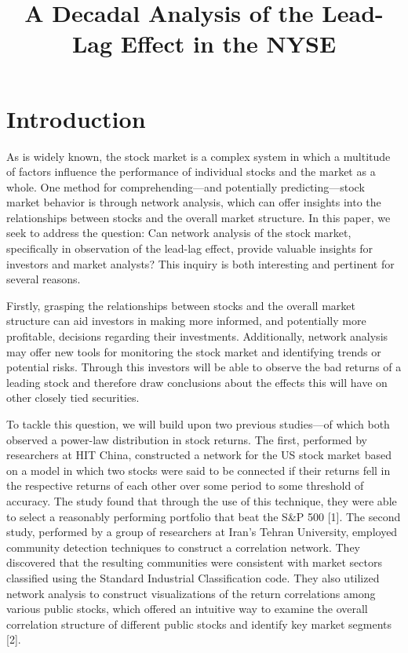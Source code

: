 \documentclass{article}
\title{A Decadal Analysis of the Lead-Lag Effect in the NYSE}
\begin{document}
\maketitle
\section{Introduction}
\large
As is widely known, the stock market is a complex system in which a multitude of factors influence the performance of individual stocks and the market as a whole. One method for comprehending—and potentially predicting—stock market behavior is through network analysis, which can offer insights into the relationships between stocks and the overall market structure. In this paper, we seek to address the question: Can network analysis of the stock market, specifically in observation of the lead-lag effect, provide valuable insights for investors and market analysts? This inquiry is both interesting and pertinent for several reasons.

Firstly, grasping the relationships between stocks and the overall market structure can aid investors in making more informed, and potentially more profitable, decisions regarding their investments. Additionally, network analysis may offer new tools for monitoring the stock market and identifying trends or potential risks. Through this investors will be able to observe the bad returns of a leading stock and therefore draw conclusions about the effects this will have on other closely tied securities.

To tackle this question, we will build upon two previous studies—of which both observed a power-law distribution in stock returns. The first, performed by researchers at HIT China, constructed a network for the US stock market based on a model in which two stocks were said to be connected if their returns fell in the respective returns of each other over some period to some threshold of accuracy. The study found that through the use of this technique, they were able to select a reasonably performing portfolio that beat the S\&P 500 [1]. The second study, performed by a group of researchers at Iran's Tehran University, employed community detection techniques to construct a correlation network. They discovered that the resulting communities were consistent with market sectors classified using the Standard Industrial Classification code. They also utilized network analysis to construct visualizations of the return correlations among various public stocks, which offered an intuitive way to examine the overall correlation structure of different public stocks and identify key market segments [2].
\end{document}
